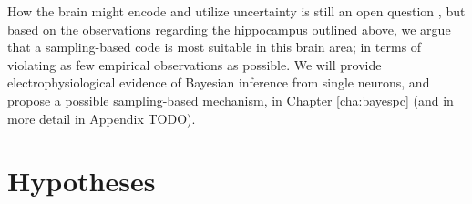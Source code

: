 \begin{itemize}

\end{itemize}

How the brain might encode and utilize uncertainty is still an open question \citep{pouget2013probabilistic}, but based on the observations regarding the hippocampus outlined above, we argue that a sampling-based code is most suitable in this brain area; in terms of violating as few empirical observations as possible. We will provide electrophysiological evidence of Bayesian inference from single neurons, and propose a possible sampling-based mechanism, in Chapter \ref{cha:bayespc} (and in more detail in Appendix TODO).









\section{Hypotheses}
\label{sec:intro:hypotheses}

